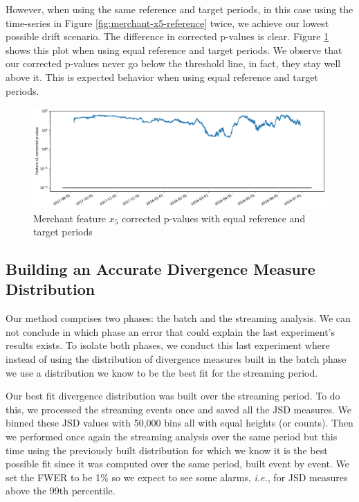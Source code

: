 However, when using the same reference and target periods, in this case using the time-series in Figure \ref{fig:merchant-x5-reference} twice, we achieve our lowest possible drift scenario. The difference in corrected p-values is clear. Figure \ref{fig:merchant2-x5-correctedpvalues} shows this plot when using equal reference and target periods. We observe that our corrected p-values never go below the threshold line, in fact, they stay well above it. This is expected behavior when using equal reference and target periods.
\begin{figure}[!htb]
    \begin{center}
      \includegraphics[scale=0.5]{figures/merchant2-x5-correctedpvalues.pdf}
      \caption{Merchant feature $x_5$ corrected p-values with equal reference and target periods}
      \label{fig:merchant2-x5-correctedpvalues}
    \end{center}
\end{figure}


\subsection{Building an Accurate Divergence Measure Distribution}
Our method comprises two phases: the batch and the streaming analysis. We can not conclude in which phase an error that could explain the last experiment's results exists. To isolate both phases, we conduct this last experiment where instead of using the distribution of divergence measures built in the batch phase we use a distribution we know to be the best fit for the streaming period. 

Our best fit divergence distribution was built over the streaming period. To do this, we processed the streaming events once and saved all the JSD measures. We binned these JSD values with 50,000 bins all with equal heights (or counts). Then we performed once again the streaming analysis over the same period but this time using the previously built distribution for which we know it is the best possible fit since it was computed over the same period, built event by event. We set the FWER to be 1\% so we expect to see some alarms, \textit{i.e.}, for JSD measures above the 99th percentile.


